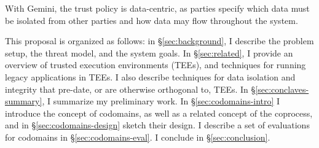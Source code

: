 %
With Gemini, the trust policy is data-centric, as parties specify which data
must be isolated from other parties and how data may flow throughout the
system.


This proposal is organized as follows: in \S\ref{sec:background}, I describe
the problem setup, the threat model, and the system goals.
%
In \S\ref{sec:related}, I provide an overview of trusted execution
environments (TEEs), and techniques for running legacy applications
in TEEs.
%
I also describe techniques for data isolation and integrity that pre-date, or
are otherwise orthogonal to, TEEs.
%
In \S\ref{sec:conclaves-summary}, I summarize my preliminary work.
%
In \S\ref{sec:codomains-intro} I introduce the concept of codomains, as well as
a related concept of the coprocess, and in \S\ref{sec:codomains-design} sketch
their design.
%
I describe a set of evaluations for codomains in \S\ref{sec:codomains-eval}.
%
I conclude in \S\ref{sec:conclusion}.
